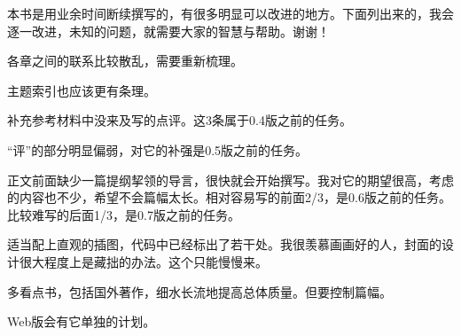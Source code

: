本书是用业余时间断续撰写的，有很多明显可以改进的地方。下面列出来的，我会逐一改进，未知的问题，就需要大家的智慧与帮助。谢谢！
\begin{lyenumerate}
\item 各章之间的联系比较散乱，需要重新梳理。
\item 主题索引也应该更有条理。
\item 补充参考材料中没来及写的点评。这3条属于0.4版之前的任务。
\item “评”的部分明显偏弱，对它的补强是0.5版之前的任务。
\item 正文前面缺少一篇提纲挈领的导言，很快就会开始撰写。我对它的期望很高，考虑的内容也不少，希望不会篇幅太长。相对容易写的前面2/3，是0.6版之前的任务。比较难写的后面1/3，是0.7版之前的任务。
\item 适当配上直观的插图，代码中已经标出了若干处。我很羡慕画画好的人，封面的设计很大程度上是藏拙的办法。这个只能慢慢来。
\item 多看点书，包括国外著作，细水长流地提高总体质量。但要控制篇幅。
\item Web版会有它单独的计划。
\end{lyenumerate}

